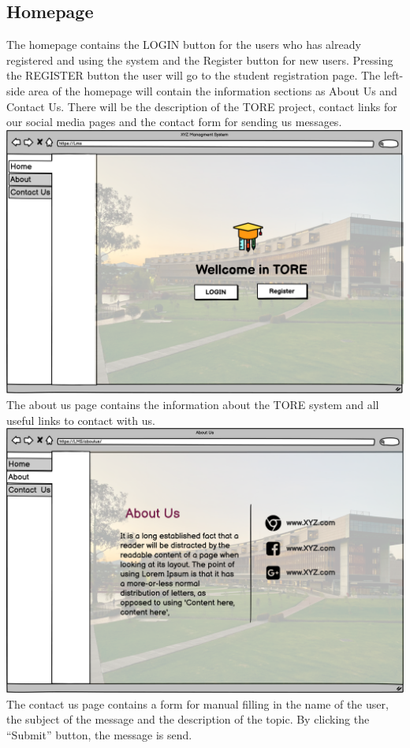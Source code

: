 \subsection{Homepage}
The homepage contains the LOGIN button for the users who has already registered and using the system and the Register button for new users. Pressing the REGISTER button the user will go to the student registration page. The left-side area of the homepage will contain the information sections as About Us and Contact Us. There will be the description of the TORE project, contact links for our social media pages and the contact form for sending us messages.\\ 

\includegraphics[width=\columnwidth]{images/HomePage.png}
\newpage
The about us page contains the information about the TORE system and all useful links to contact with us.\\

\includegraphics[width=\columnwidth]{images/New Wireframe 2.png}
\newpage
The contact us page contains a form for manual filling in the name of the user, the subject of the message and the description of the topic. By clicking the “Submit” button, the message is send.\\

